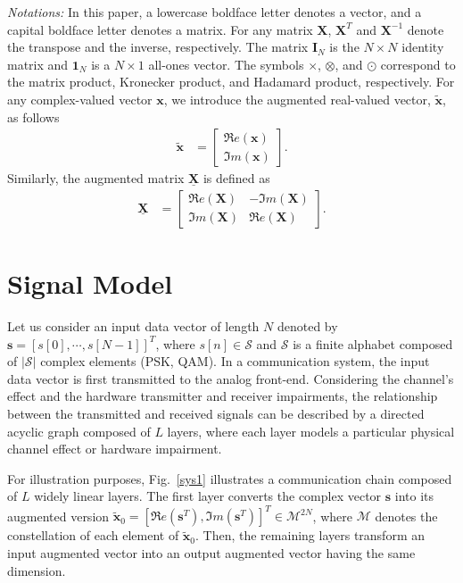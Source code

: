 \documentclass{article}
\begin{document}
\textit{Notations:} In this paper, a lowercase boldface letter denotes a vector, and a capital boldface letter denotes a matrix. For any matrix $\mathbf{X}$, $\mathbf{X}^T$ and $\mathbf{X}^{-1}$ denote the transpose and the inverse, respectively. The matrix $\mathbf{I}_N$ is the $N\times N$ identity matrix and $\mathbf{1}_N$ is a $N\times 1$ all-ones vector. The symbols $\times$, $\otimes$, and $\odot$ correspond to the matrix product, Kronecker product, and Hadamard product, respectively. For any complex-valued vector $\mathbf{x}$, we introduce the augmented real-valued vector, $\tilde{\mathbf{x}}$, as follows
\begin{align}
\tilde{\mathbf{x}}&=\begin{bmatrix}
\Re e(\mathbf{x}) \\
\Im m(\mathbf{x})
\end{bmatrix}.
\end{align}
Similarly, the augmented matrix $\underline{\mathbf{X}}$ is defined as
\begin{align}
\underline{\mathbf{X}}&=\begin{bmatrix}
\Re e(\mathbf{X}) & -\Im m(\mathbf{X}) \\
\Im m(\mathbf{X}) &\Re e(\mathbf{X}) 
\end{bmatrix}.
\end{align}

\section{Signal Model}
\label{comchannel}

Let us consider an input data vector of length $N$ denoted by $\mathbf{s}=[s[0],\cdots,s[N-1]]^T$, where $s[n] \in \mathcal{S}$ and $\mathcal{S}$ is a finite alphabet composed of $|\mathcal{S}|$ complex elements (PSK, QAM). 
In a communication system, the input data vector is first transmitted to the analog front-end. Considering the channel's effect and the hardware transmitter and receiver impairments, the relationship between the transmitted and received signals can be described by a directed acyclic graph composed of $L$ layers, where each layer models a particular physical channel effect or hardware impairment.

For illustration purposes, Fig.~\ref{sys1} illustrates a communication chain composed of $L$ widely linear layers. The first layer converts the complex vector $\mathbf{s}$ into its augmented version $\tilde{\mathbf{x}}_0=[\Re e(\mathbf{s}^T),\Im m(\mathbf{s}^T)]^T \in \mathcal{M}^{2N}$, where $ \mathcal{M}$ denotes the constellation of each element of $\tilde{\mathbf{x}}_0$. Then, the remaining layers transform an input augmented vector into an output augmented vector having the same dimension. 
\end{document}
